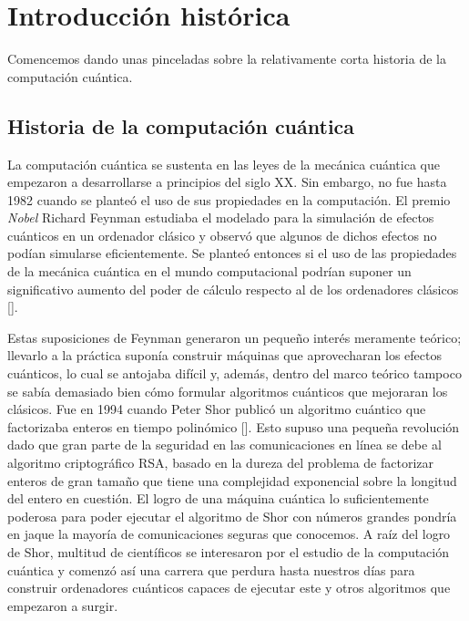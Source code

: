 \chapter{Introducción histórica}

Comencemos dando unas pinceladas sobre la relativamente corta historia de la computación cuántica.

\section{Historia de la computación cuántica}
\label{sec:sec11}

La computación cuántica se sustenta en las leyes de la mecánica cuántica que empezaron a desarrollarse a principios del siglo XX. Sin embargo, no fue hasta 1982 cuando se planteó el uso de sus propiedades en la computación. El premio \textit{Nobel} Richard Feynman estudiaba el modelado para la simulación de efectos cuánticos en un ordenador clásico y observó que algunos de dichos efectos no podían simularse eficientemente. Se planteó entonces si el uso de las propiedades de la mecánica cuántica en el mundo computacional podrían suponer un significativo aumento del poder de cálculo respecto al de los ordenadores clásicos [\cite{feynman1982modeling}].

Estas suposiciones de Feynman generaron un pequeño interés meramente teórico; llevarlo a la práctica suponía construir máquinas que aprovecharan los efectos cuánticos, lo cual se antojaba difícil y, además, dentro del marco teórico tampoco se sabía demasiado bien cómo formular algoritmos cuánticos que mejoraran los clásicos. Fue en 1994 cuando Peter Shor publicó un algoritmo cuántico que factorizaba enteros en tiempo polinómico [\cite{shor1994algorithms}]. Esto supuso una pequeña revolución dado que gran parte de la seguridad en las comunicaciones en línea se debe al algoritmo criptográfico RSA, basado en la dureza del problema de factorizar enteros de gran tamaño que tiene una complejidad exponencial sobre la longitud del entero en cuestión. El logro de una máquina cuántica lo suficientemente poderosa para poder ejecutar el algoritmo de Shor con números grandes pondría en jaque la mayoría de comunicaciones seguras que conocemos. A raíz del logro de Shor, multitud de científicos se interesaron por el estudio de la computación cuántica y comenzó así una carrera que perdura hasta nuestros días para construir ordenadores cuánticos capaces de ejecutar este y otros algoritmos que empezaron a surgir.

